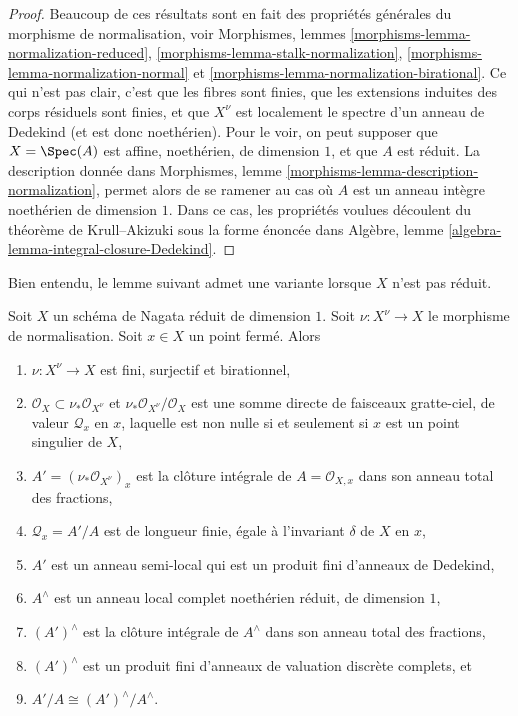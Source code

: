 \begin{proof}
Beaucoup de ces résultats sont en fait des propriétés générales du morphisme
de normalisation, voir
Morphismes, lemmes \ref{morphisms-lemma-normalization-reduced},
\ref{morphisms-lemma-stalk-normalization},
\ref{morphisms-lemma-normalization-normal} et
\ref{morphisms-lemma-normalization-birational}.
Ce qui n'est pas clair, c'est que les fibres sont finies,
que les extensions induites des corps résiduels sont finies, et
que $X^\nu$ est localement le spectre d'un
anneau de Dedekind (et est donc noethérien).
Pour le voir, on peut supposer que $X = \Spec(A)$ est
affine, noethérien, de dimension $1$, et que $A$ est réduit.
La description donnée dans
Morphismes, lemme \ref{morphisms-lemma-description-normalization},
permet alors de se ramener au cas où $A$ est un anneau intègre noethérien
de dimension $1$. Dans ce cas, les propriétés voulues
découlent du théorème de Krull--Akizuki sous la forme énoncée dans
Algèbre, lemme \ref{algebra-lemma-integral-closure-Dedekind}.
\end{proof}

\noindent
Bien entendu, le lemme suivant admet une variante lorsque
$X$ n'est pas réduit.

\begin{lemma}
\label{lemma-prepare-delta-invariant}
Soit $X$ un schéma de Nagata réduit de dimension $1$. Soit $\nu : X^\nu \to X$
le morphisme de normalisation. Soit $x \in X$ un point fermé. Alors
\begin{enumerate}
\item $\nu : X^\nu \to X$ est fini, surjectif et birationnel,
\item $\mathcal{O}_X \subset \nu_*\mathcal{O}_{X^\nu}$ et
$\nu_*\mathcal{O}_{X^\nu}/\mathcal{O}_X$ est une somme directe de
faisceaux gratte-ciel, de valeur $\mathcal{Q}_x$ en $x$, laquelle est non nulle
si et seulement si $x$ est un point singulier de $X$,
\item $A' = (\nu_*\mathcal{O}_{X^\nu})_x$ est la clôture intégrale
de $A = \mathcal{O}_{X, x}$ dans son anneau total des fractions,
\item $\mathcal{Q}_x = A'/A$ est de longueur finie, égale à
l'invariant $\delta$ de $X$ en $x$,
\item $A'$ est un anneau semi-local qui est un produit fini
d'anneaux de Dedekind,
\item $A^\wedge$ est un anneau local complet noethérien
réduit, de dimension $1$,
\item $(A')^\wedge$ est la clôture intégrale de $A^\wedge$
dans son anneau total des fractions,
\item $(A')^\wedge$ est un produit fini d'anneaux
de valuation discrète complets, et
\item $A'/A \cong (A')^\wedge/A^\wedge$.
\end{enumerate}
\end{lemma}

